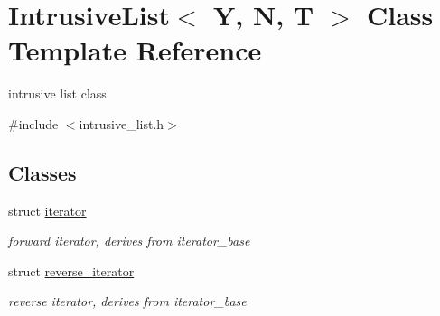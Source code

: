 \hypertarget{classIntrusiveList}{}\section{Intrusive\+List$<$ Y, N, T $>$ Class Template Reference}
\label{classIntrusiveList}


intrusive list class  




{\ttfamily \#include $<$intrusive\+\_\+list.\+h$>$}

\subsection*{Classes}
\begin{DoxyCompactItemize}
\item 
struct \hyperlink{structIntrusiveList_1_1iterator}{iterator}
\begin{DoxyCompactList}\small\item\em forward iterator, derives from iterator\+\_\+base \end{DoxyCompactList}\item 
struct \hyperlink{structIntrusiveList_1_1reverse__iterator}{reverse\+\_\+iterator}
\begin{DoxyCompactList}\small\item\em reverse iterator, derives from iterator\+\_\+base \end{DoxyCompactList}\end{DoxyCompactItemize}
